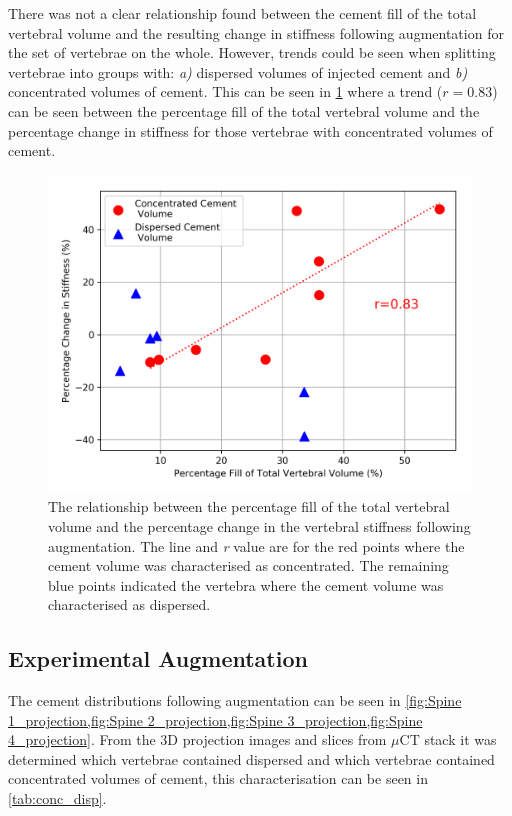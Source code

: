 There was not a clear relationship found between the cement fill of the total
vertebral volume and the resulting change in stiffness following augmentation
for the set of vertebrae on the whole.
However, trends could be seen when splitting vertebrae into groups with:
\textit{a)} dispersed volumes of injected cement and \textit{b)} concentrated
volumes of cement.
This can be seen in \cref{fig:aug_cmt_fill_vs_ch_stiff} where a trend
($r=0.83$) can be seen between the percentage fill of the total vertebral
volume and the percentage change in stiffness for those vertebrae with
concentrated volumes of cement.

\begin{figure}[h!]
  \centering
 
\includegraphics[width=.7\textwidth]{Chapters/Chapter_HT_images/Aug_cmt_fill_vs_ch_stiff.png}
	\caption{The relationship between the percentage fill of the total vertebral
volume and the percentage change in the vertebral stiffness following
augmentation. The line and \textit{r} value are for the red points where the
cement volume was characterised as concentrated. The remaining blue points
indicated the vertebra where the cement volume was characterised as
dispersed.}
  \label{fig:aug_cmt_fill_vs_ch_stiff}
\end{figure}

\subsection{Experimental Augmentation}

The cement distributions following augmentation can be seen in \cref{fig:Spine
1_projection,fig:Spine 2_projection,fig:Spine 3_projection,fig:Spine
4_projection}.
From the 3D projection images and slices from $\mu$CT stack it was determined
which vertebrae contained dispersed and which vertebrae contained concentrated
volumes of cement, this characterisation can be seen in \cref{tab:conc_disp}.



